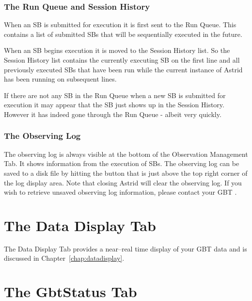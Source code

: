 \subsubsection{The Run Queue and Session History}

When an \gls{SB} is submitted for execution it is first sent to the Run Queue.  This
contains a list of submitted \glspl{SB} that will be sequentially executed in the future.

When an \gls{SB} begins execution it is moved to the Session History list.  So the
Session History list contains the currently executing \gls{SB} on the first line and all
previously executed \glspl{SB} that have been run while the current instance of \gls{Astrid}
has been running on subsequent lines.

If there are not any \gls{SB} in the Run Queue when a new \gls{SB} is submitted
for execution it may appear that the \gls{SB} just shows up in the Session History.
However it has indeed gone through the Run Queue - albeit very quickly.

\subsubsection{The Observing Log}

The observing log is always visible at the bottom of the Observation Management
Tab.  It shows information from the execution of \glspl{SB}.  The observing log can be
saved to a disk file by hitting the  button that is just above the top right
corner of the log display area.  Note that closing \gls{Astrid} will clear the observing log.
If you wish to retrieve unsaved observing log information, please contact your \gls{GBT}
.

\section{The Data Display Tab}
 
The Data Display Tab provides a near--real time display of your \gls{GBT} data and
is discussed in Chapter~\ref{chap:datadisplay}.
\newpage
\section{The GbtStatus Tab}\label{sec:astridstatus}
 
